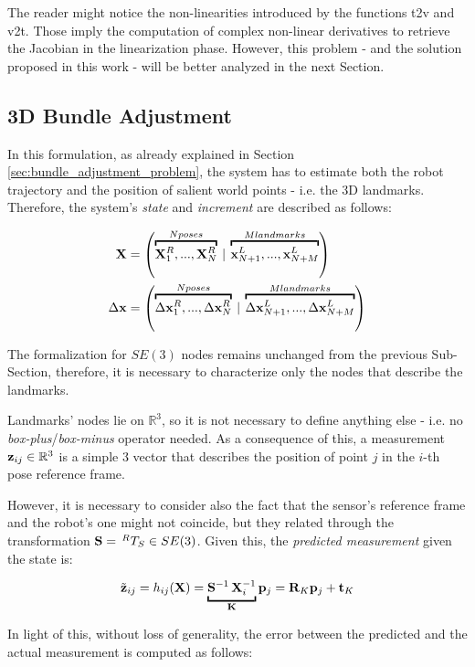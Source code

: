 The reader might notice the non-linearities introduced by the functions t2v and v2t. Those imply the computation of complex non-linear derivatives to retrieve the Jacobian in the linearization phase. However, this problem - and the solution proposed in this work - will be better analyzed in the next Section.

\subsection{3D Bundle Adjustment}\label{subsec:3d_bundle_adj}
In this formulation, as already explained in Section \ref{sec:bundle_adjustment_problem}, the system has to estimate both the robot trajectory and the position of salient world points - i.e. the 3D landmarks. Therefore, the system's \textit{state} and \textit{increment} are described as follows:

\begin{align*}
    \SState &= \left(\overbracket{\SState^R_1, ..., \SState^R_N}^{N poses}\: |\: \overbracket{\state^L_{N+1}, ..., \state^L_{N+M}}^{M landmarks}\right) \\
    \dx &= \left(\overbracket{\dx^R_1, ..., \dx^R_N}^{N poses}\: |\: \overbracket{\dx^L_{N+1}, ..., \dx^L_{N+M}}^{M landmarks}\right)
\end{align*}

The formalization for $SE(3)$ nodes remains unchanged from the previous Sub-Section, therefore, it is necessary to characterize only the nodes that describe the landmarks. 

Landmarks' nodes lie on $\mathbb{R}^3$, so it is not necessary to define anything else - i.e. no \textit{box-plus}/\textit{box-minus} operator needed. As a consequence of this, a measurement $\mathbf{z}_{ij} \in \mathbb{R}^3$ is a simple 3 vector that describes the position of point $j$ in the $i$-th pose reference frame.

However, it is necessary to consider also the fact that the sensor's reference frame and the robot's one might not coincide, but they related through the transformation $\mathbf{S} = \,^{R}T_{S} \in SE(3)$. Given this, the \textit{predicted measurement} given the state is:

\begin{equation}
    \label{eq:prediction_se3r3}
    \tmeas_{ij} = h_{ij}(\SState) = \underbracket{\S^{-1}\,\SState_i^{-1}}_{\mathbf{K}}\p_j = \rot_{K}\p_j + \trans_K
\end{equation}

\noindent In light of this, without loss of generality, the error between the predicted and the actual measurement is computed as follows:

